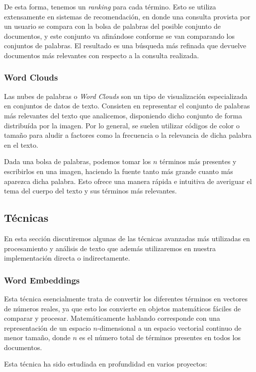 De esta forma, tenemos un \textit{ranking} para cada término. Esto se utiliza extensamente en sistemas de recomendación, en donde una consulta provista por un usuario se compara con la bolsa de palabras del posible conjunto de documentos, y este conjunto va afinándose conforme se van comparando los conjuntos de palabras. El resultado es una búsqueda más refinada que devuelve documentos más relevantes con respecto a la consulta realizada.

\subsubsection{Word Clouds}
Las nubes de palabras o \textit{Word Clouds} son un tipo de visualización especializada en conjuntos de datos de texto. Consisten en representar el conjunto de palabras más relevantes del texto que analicemos, disponiendo dicho conjunto de forma distribuída por la imagen. Por lo general, se suelen utilizar códigos de color o tamaño para aludir a factores como la frecuencia o la relevancia de dicha palabra en el texto.

Dada una bolsa de palabras, podemos tomar los $n$ términos más presentes y escribirlos en una imagen, haciendo la fuente tanto más grande cuanto más aparezca dicha palabra. Esto ofrece una manera rápida e intuitiva de averiguar el tema del cuerpo del texto y sus términos más relevantes.


\subsection{Técnicas}
En esta sección discutiremos algunas de las técnicas avanzadas más utilizadas en procesamiento y análisis de texto que además utilizaremos en nuestra implementación directa o indirectamente.

\subsubsection{Word Embeddings}
Esta técnica esencialmente trata de convertir los diferentes términos en vectores de números reales, ya que esto los convierte en objetos matemáticos fáciles de comparar y procesar. Matemáticamente hablando corresponde con una representación de un espacio $n$-dimensional a un espacio vectorial continuo de menor tamaño, donde $n$ es el número total de términos presentes en todos los documentos.

Esta técnica ha sido estudiada en profundidad en varios proyectos:

